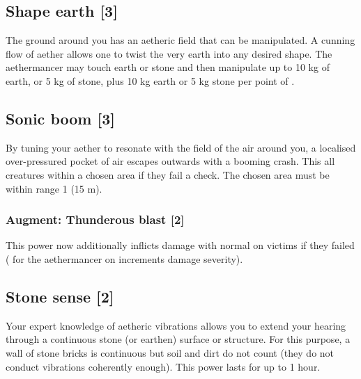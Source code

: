 

\subsection{Shape earth [3]}
The ground around you has an aetheric field that can be manipulated. A cunning flow of aether allows one to twist the very earth into any desired shape. The aethermancer may touch earth or stone and then manipulate up to 10 kg of earth, or 5 kg of stone, plus 10 kg earth or 5 kg stone per point of . 


\subsection{Sonic boom [3]}
By tuning your aether to resonate with the field of the air around you, a localised over-pressured pocket of air escapes outwards with a booming crash. This  all creatures within a chosen area if they fail a  check. The chosen area must be within range 1 (15 m).
\subsubsection{Augment: Thunderous blast [2]}
This power now additionally inflicts damage with normal  on victims if they failed  ( for the aethermancer on  increments damage severity).


\subsection{Stone sense [2]}
\label{spell:stone-sense}
Your expert knowledge of aetheric vibrations allows you to extend your hearing through a continuous stone (or earthen) surface or structure. For this purpose, a wall of stone bricks is continuous but soil and dirt do not count (they do not conduct vibrations coherently enough). This power lasts for up to 1 hour.


